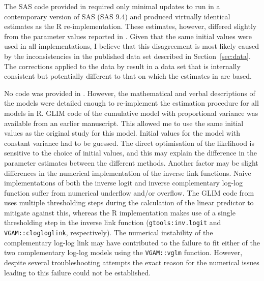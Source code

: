 The SAS code provided in \citep{dennis1986stochastic} required only minimal updates to run in a contemporary version of SAS (SAS 9.4) and produced virtually identical estimates as the R re-implementation. 
These estimates, however, differed slightly from the parameter values reported in \citep{kemp1986stochastic}. 
Given that the same initial values were used in all implementations, I believe that this disagreement is most likely caused by the inconsistencies in the published data set described in Section~\ref{sec:data}. 
The corrections applied to the data by \citep{candy1991modeling} result in a data set that is internally consistent but potentially different to that on which the estimates in \citep{kemp1986stochastic} are based.  

No code was provided in \citep{candy1991modeling}. 
However, the mathematical and verbal descriptions of the models were detailed enough to re-implement the estimation procedure for all models in R. 
GLIM code of the cumulative model with proportional variance was available from an earlier manuscript\citep{candy1990biology}. 
This allowed me to use the same initial values as the original study for this model. 
Initial values for the model with constant variance had to be guessed.
The direct optimisation of the likelihood is sensitive to the choice of initial values, and this may explain the difference in the parameter estimates between the different methods. Another factor may be slight differences in the numerical implementation of the inverse link functions. 
Naive implementations of both the inverse logit and inverse complementary log-log function suffer from numerical underflow and/or overflow. 
The GLIM code from \citep{candy1990biology} uses multiple thresholding steps during the calculation of the linear predictor to mitigate against this, whereas the R implementation makes use of a single thresholding step in the inverse link function (\verb+gtools:inv.logit+ and \verb+VGAM::clogloglink+, respectively).  
The numerical instability of the complementary log-log link may have contributed to the failure to fit either of the two complementary log-log models using the \verb+VGAM::vglm+ function. 
However, despite several troubleshooting attempts the exact reason for the numerical issues leading to this failure could not be established.

 